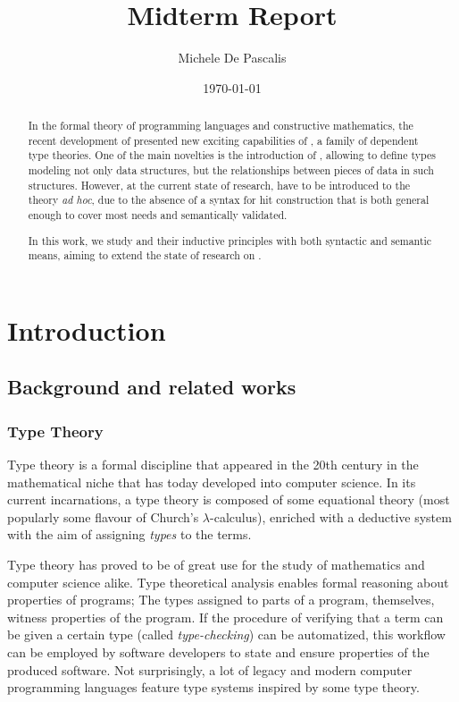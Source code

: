 \documentclass[a4paper]{article}
\author{Michele De Pascalis}
\title{Midterm Report}
\date{\today}
\begin{document}
\maketitle

\begin{abstract}
  In the formal theory of programming languages and constructive mathematics, the recent development of  presented new exciting capabilities of , a family of dependent type theories. One of the main novelties is the introduction of , allowing to define types modeling not only data structures, but the relationships between pieces of data in such structures. However, at the current state of research,  have to be introduced to the theory \emph{ad hoc}, due to the absence of a syntax for \gls{hit} construction that is both general enough to cover most needs and semantically validated.

  In this work, we study  and their inductive principles with both syntactic and semantic means, aiming to extend the state of research on .
\end{abstract}

\listoftodos

\section{Introduction}

\subsection{Background and related works}

\subsubsection{Type Theory}

Type theory is a formal discipline that appeared in the 20th century in the mathematical niche that has today developed into computer science. In its current incarnations, a type theory is composed of some equational theory (most popularly some flavour of Church's \(\lambda\)-calculus), enriched with a deductive system with the aim of assigning \textit{types} to the terms.

Type theory has proved to be of great use for the study of mathematics and computer science alike. Type theoretical analysis enables formal reasoning about properties of programs; The types assigned to parts of a program, themselves, witness properties of the program. If the procedure of verifying that a term can be given a certain type (called \textit{type-checking}) can be automatized, this workflow can be employed by software developers to state and ensure properties of the produced software. Not surprisingly, a lot of legacy and modern computer programming languages feature type systems inspired by some type theory.
\end{document}
